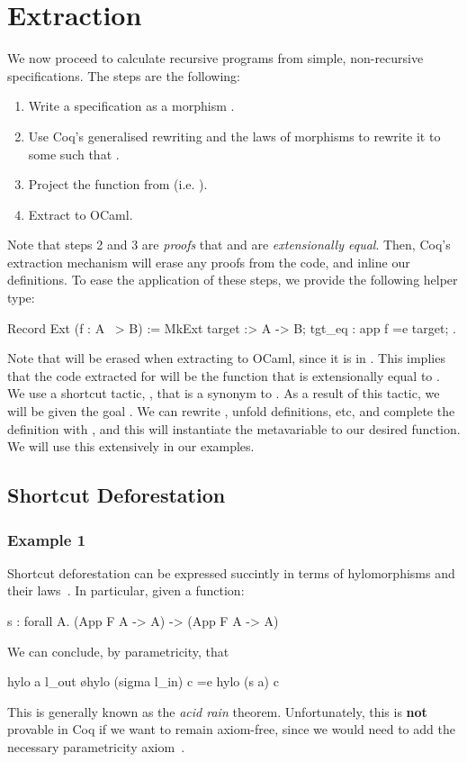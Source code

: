\documentclass[anonymous, a4paper, UKenglish, cleveref, autoref, thm-restate]{lipics-v2021}
\begin{document}
\section{Extraction}
We now proceed to calculate recursive programs from simple, non-recursive specifications.
The steps are the following:
\begin{enumerate}
  \item Write a specification as a morphism .
  \item Use Coq's generalised rewriting and the laws of morphisms to 
    rewrite it to some  such that .
  \item Project the function  from 
    (i.e. ).
  \item Extract  to OCaml.
\end{enumerate}
Note that steps 2 and 3 are \emph{proofs} that  and  are
\emph{extensionally equal}. Then, Coq's extraction mechanism will erase any
proofs from the code, and inline our definitions. To ease the application of
these steps, we provide the following helper type:
\begin{coqcode}
  Record Ext (f : A ~> B) := 
    MkExt { target :> A -> B; tgt_eq : app f =e target; }.
\end{coqcode}
Note that  will be erased when extracting  to OCaml,
since it is in . This implies that the code extracted for 
will be the function  that is extensionally equal to .  We
use a shortcut tactic, , that is a synonym to 
. As a result of this tactic, we will be given the goal 
. We can rewrite , unfold definitions, etc, and
complete the definition with , and this will instantiate the
metavariable  to our desired function. We will use this extensively
in our examples.

\subsection{Shortcut Deforestation}

\subsubsection{Example 1}
Shortcut deforestation can be expressed succintly in terms of hylomorphisms and
their laws~\cite{TakanoM95}. In particular, given a function:
\begin{coqcode}
  s  : forall A. (App F A -> A) -> (App F A -> A)
\end{coqcode}
We can conclude, by parametricity, that
\begin{coqcode}
  hylo a l_out \o hylo (sigma l_in) c =e hylo (s a) c
\end{coqcode}
This is generally known as the \emph{acid rain} theorem. Unfortunately, this is
\textbf{not} provable in Coq if we want to remain axiom-free, since we would
need to add the necessary parametricity
axiom~\cite{keller_et_al:LIPIcs.CSL.2012.381}. 
\end{document}
